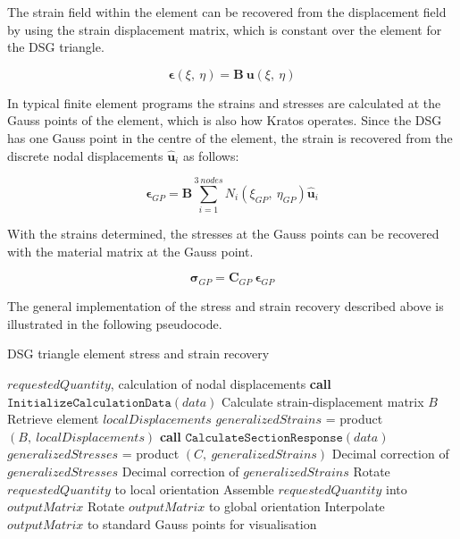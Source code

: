 The strain field within the element can be recovered from the displacement field by using the strain displacement matrix, which is constant over the element for the DSG triangle.

\begin{equation} 
\boldsymbol{\epsilon}(\xi,\ \eta) = \mathbf{B}\ \mathbf{u}(\xi,\ \eta)
\label{eqt19}
\end{equation}

In typical finite element programs the strains and stresses are calculated at the Gauss points of the element, which is also how Kratos operates. Since the DSG has one Gauss point in the centre of the element, the strain is recovered from the discrete nodal displacements $\hat{\mathbf{u}}_i$ as follows:

\begin{equation} 
\boldsymbol{\epsilon}_{GP} = \mathbf{B} \sum_{i=1}^{3\ nodes} N_i(\xi_{GP},\ \eta_{GP}) \hat{\mathbf{u}}_i
\label{eqt20}
\end{equation}

With the strains determined, the stresses at the Gauss points can be recovered with the material matrix at the Gauss point.

\begin{equation} 
\boldsymbol{\sigma}_{GP} = \mathbf{C}_{GP}\ \boldsymbol{\epsilon}_{GP}
\label{eqt21}
\end{equation}

The general implementation of the stress and strain recovery described above is illustrated in the following pseudocode.

\begin{algorithm}
	\caption{DSG triangle element stress and strain recovery}
	\label{DSG triangle element stress and strain recovery}
	\begin{algorithmic}[1]
		\Require $requestedQuantity$, calculation of nodal displacements
		\State \textbf{call} $\texttt{InitializeCalculationData}(data)$
		\State \hspace{\algorithmicindent}Calculate strain-displacement matrix $B$
		\State \hspace{\algorithmicindent}Retrieve element $localDisplacements$
		\State $generalizedStrains$ = product$(B,\ localDisplacements)$
				\State \textbf{call} $\texttt{CalculateSectionResponse}(data)$
				\State $generalizedStresses$ = product $(C,\ generalizedStrains)$
				\State Decimal correction of $generalizedStresses$
		\EndIf
		\State Decimal correction of $generalizedStrains$ 
				\State Rotate $requestedQuantity$ to local orientation
		\EndIf
		\State Assemble $requestedQuantity$ into $outputMatrix$
				\State Rotate $outputMatrix$ to global orientation
		\EndIf
		\State Interpolate $outputMatrix$ to standard Gauss points for visualisation
	\end{algorithmic}
\end{algorithm}